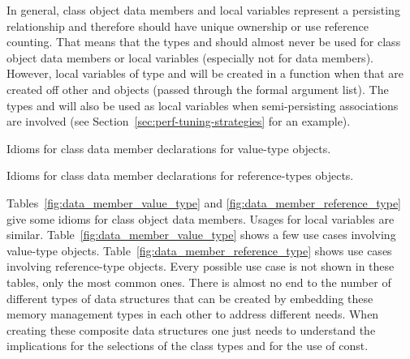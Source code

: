\documentclass[pdf,ps2pdf,11pt]{SANDreport}
\begin{document}
In general, class object data members and local variables represent a
persisting relationship and therefore should have unique ownership or
use reference counting.  That means that the types {} and
{} should almost never be used for class object data
members or local variables (especially not for data members).
However, local variables of type {} and {}
will be created in a function when that are created off other
{} and {} objects (passed through the formal
argument list).  The types {} and {} will also
be used as local variables when semi-persisting associations are
involved (see Section~\ref{sec:perf-tuning-strategies} for an
example).


\begin{table}
%
\begin{center}
%
%

%
%
\end{center}
\caption{\label{fig:data_member_value_type}
Idioms for class data member declarations for value-type objects.}
%
\end{table}


\begin{table}
%
\begin{center}
%
%

%
%
\end{center}
\caption{\label{fig:data_member_reference_type}
Idioms for class data member declarations for reference-types
objects.}
%
\end{table}


Tables~\ref{fig:data_member_value_type} and
{}\ref{fig:data_member_reference_type} give some idioms for class
object data members.  Usages for local variables are similar.
Table~\ref{fig:data_member_value_type} shows a few use cases involving
value-type objects.  Table~\ref{fig:data_member_reference_type} shows
use cases involving reference-type objects.  Every possible use case
is not shown in these tables, only the most common ones.  There is
almost no end to the number of different types of data structures that
can be created by embedding these memory management types in each
other to address different needs.  When creating these composite data
structures one just needs to understand the implications for the
selections of the class types and for the use of const.
\end{document}
